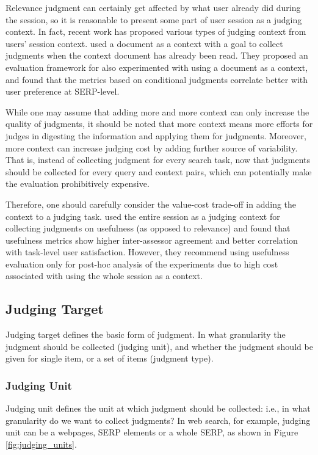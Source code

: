 \documentclass[openany]{now} %
\begin{document}
Relevance judgment can certainly get affected by what user already did during the session, so it is reasonable to present some part of user session as a judging context. In fact, recent work has proposed various types of judging context from users' session context. \cite{Chandar2013} used a document as a context with a goal to collect judgments when the context document has already been read. They proposed an evaluation framework for \cite{Golbus:2014:CDR} also experimented with using a document as a context, and found that the metrics based on conditional judgments correlate better with user preference at SERP-level.

While one may assume that adding more and more context can only increase the quality of judgments, it should be noted that more context means more efforts for judges in digesting the information and applying them for judgments. Moreover, more context can increase judging cost by adding further source of variability. That is, instead of collecting judgment for every search task, now that judgments should be collected for every query and context pairs, which can potentially make the evaluation prohibitively expensive.

Therefore, one should carefully consider the value-cost trade-off in adding the context to a judging task. \cite{Mao:2016} used the entire session as a judging context for collecting judgments on usefulness (as opposed to relevance) and found that usefulness metrics show higher inter-assessor agreement and better correlation with task-level user satisfaction. However, they recommend using usefulness evaluation only for post-hoc analysis of the experiments due to high cost associated with using the whole session as a context.

\subsection{Judging Target}
Judging target defines the basic form of judgment. In what granularity the judgment should be collected (judging unit), and whether the judgment should be given for single item, or a set of items (judgment type). 

\subsubsection{Judging Unit}
Judging unit defines the unit at which judgment should be collected: i.e., in what granularity do we want to collect judgments? In web search, for example, judging unit can be a webpages, SERP elements or a whole SERP, as shown in Figure \ref{fig:judging_units}. 
\end{document}

